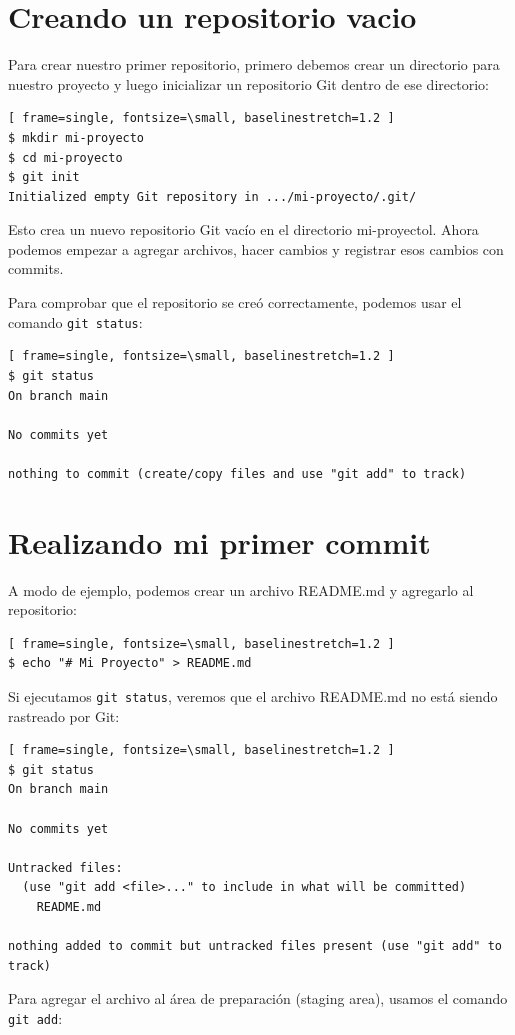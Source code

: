 \documentclass[a4paper,12pt]{report}
\begin{document}
\section{Creando un repositorio vacio}
Para crear nuestro primer repositorio, primero debemos crear un directorio para nuestro proyecto y luego inicializar un
repositorio Git dentro de ese directorio:
\begin{Verbatim}[ frame=single, fontsize=\small, baselinestretch=1.2 ]
$ mkdir mi-proyecto
$ cd mi-proyecto
$ git init
Initialized empty Git repository in .../mi-proyecto/.git/
\end{Verbatim}
Esto crea un nuevo repositorio Git vacío en el directorio mi-proyectol. Ahora podemos empezar a agregar archivos,
hacer cambios y registrar esos cambios con commits.

Para comprobar que el repositorio se creó correctamente, podemos usar el comando \texttt{git status}:
\begin{Verbatim}[ frame=single, fontsize=\small, baselinestretch=1.2 ]
$ git status
On branch main

No commits yet

nothing to commit (create/copy files and use "git add" to track)
\end{Verbatim}

\section{Realizando mi primer commit}
A modo de ejemplo, podemos crear un archivo README.md y agregarlo al repositorio:
\begin{Verbatim}[ frame=single, fontsize=\small, baselinestretch=1.2 ]
$ echo "# Mi Proyecto" > README.md
\end{Verbatim}

Si ejecutamos \texttt{git status}, veremos que el archivo README.md no está siendo rastreado por Git:
\begin{Verbatim}[ frame=single, fontsize=\small, baselinestretch=1.2 ]
$ git status
On branch main

No commits yet

Untracked files:
  (use "git add <file>..." to include in what will be committed)
	README.md

nothing added to commit but untracked files present (use "git add" to track)
\end{Verbatim}

Para agregar el archivo al área de preparación (staging area), usamos el comando \texttt{git add}:
\end{document}
